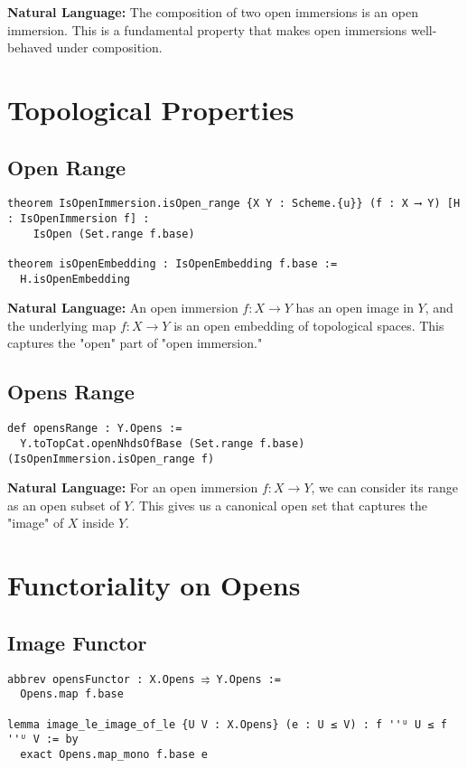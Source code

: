 \documentclass{article}
\theoremstyle{definition}
\begin{document}
\textbf{Natural Language:} The composition of two open immersions is an open immersion. This is a fundamental property that makes open immersions well-behaved under composition.

\section{Topological Properties}

\subsection{Open Range}

\begin{lstlisting}
theorem IsOpenImmersion.isOpen_range {X Y : Scheme.{u}} (f : X ⟶ Y) [H : IsOpenImmersion f] :
    IsOpen (Set.range f.base)

theorem isOpenEmbedding : IsOpenEmbedding f.base :=
  H.isOpenEmbedding
\end{lstlisting}

\textbf{Natural Language:} An open immersion $f: X \to Y$ has an open image in $Y$, and the underlying map $f: X \to Y$ is an open embedding of topological spaces. This captures the "open" part of "open immersion."

\subsection{Opens Range}

\begin{lstlisting}
def opensRange : Y.Opens :=
  Y.toTopCat.openNhdsOfBase (Set.range f.base) (IsOpenImmersion.isOpen_range f)
\end{lstlisting}

\textbf{Natural Language:} For an open immersion $f: X \to Y$, we can consider its range as an open subset of $Y$. This gives us a canonical open set that captures the "image" of $X$ inside $Y$.

\section{Functoriality on Opens}

\subsection{Image Functor}

\begin{lstlisting}
abbrev opensFunctor : X.Opens ⥤ Y.Opens :=
  Opens.map f.base

lemma image_le_image_of_le {U V : X.Opens} (e : U ≤ V) : f ''ᵁ U ≤ f ''ᵁ V := by
  exact Opens.map_mono f.base e
\end{lstlisting}
\end{document}

